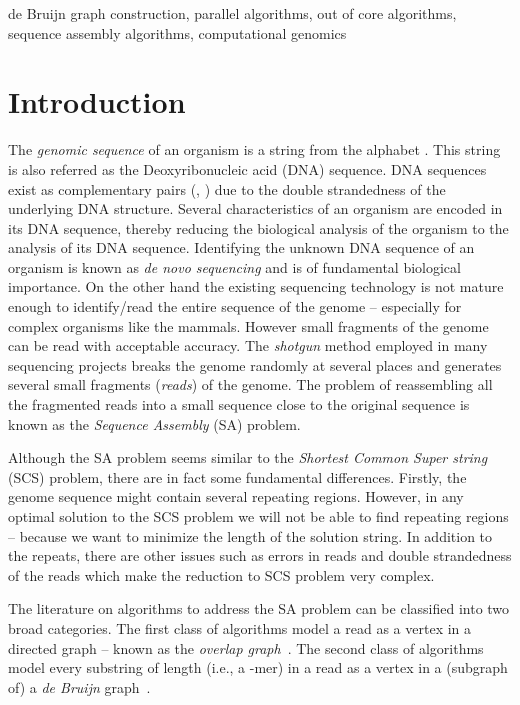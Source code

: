 \documentclass[11pt,conference,twocolumn]{IEEEtran}
\begin{document}
\begin{keywords}
de Bruijn graph construction, parallel algorithms, out of core algorithms,
sequence assembly algorithms, computational genomics
\end{keywords}

\section{Introduction}

\PARstart The {\em genomic sequence} of an organism is a string from the alphabet .
This string is also referred as the Deoxyribonucleic acid (DNA) sequence. DNA sequences exist as 
complementary pairs (, ) due to the double strandedness of the underlying DNA structure. 
Several characteristics of an organism are encoded in its DNA sequence, thereby reducing the 
biological analysis of the organism to the analysis of its DNA sequence. Identifying the unknown 
DNA sequence of an organism is known as {\em de novo sequencing} and is of fundamental biological 
importance. On the other hand the existing sequencing technology is not mature enough to identify/read the 
entire sequence of the genome -- especially for complex organisms like the mammals. However small 
fragments of the genome can be read with acceptable accuracy.  The {\em shotgun} method employed 
in many sequencing projects breaks the genome randomly at several places and generates several
small fragments ({\em reads}) of the genome. The problem of reassembling all the fragmented reads into 
a small sequence close to the original sequence is known as the {\em Sequence Assembly }(SA) problem. 

Although the SA problem seems similar to the {\em Shortest Common Super string} (SCS) problem, there are
in fact some fundamental differences. Firstly, the genome sequence might contain several repeating
regions. However, in any optimal solution to the SCS problem we will not be able to find repeating 
regions -- because we want to minimize the length of the solution string. In addition to the repeats, there 
are other issues such as errors in reads and double strandedness of the reads which make the 
reduction to SCS problem very complex. 

The literature on algorithms to address the SA problem can be classified into two broad categories. 
The first class of algorithms model a read as a vertex in a directed graph -- known as the 
{\em overlap graph}~\cite{myers95}. The second class 
of algorithms model every substring of length  (i.e., a -mer) in a read as a vertex in a (subgraph of)
a {\em de Bruijn} graph~\cite{pevzner01}.
\end{document}
